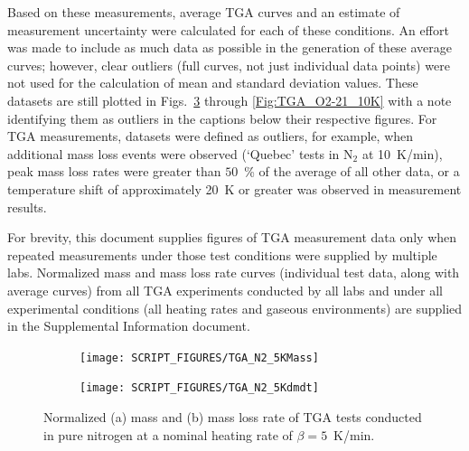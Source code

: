 \documentclass{book}
\begin{document}
Based on these measurements, average TGA curves and an estimate of measurement uncertainty were calculated for each of these conditions. An effort was made to include as much data as possible in the generation of these average curves; however, clear outliers (full curves, not just individual data points) were not used for the calculation of mean and standard deviation values. These datasets are still plotted in Figs.~\ref{Fig:TGA_N2_5K} through \ref{Fig:TGA_O2-21_10K} with a note identifying them as outliers in the captions below their respective figures. For TGA measurements, datasets were defined as outliers, for example, when additional mass loss events were observed (‘Quebec’ tests in N$_2$ at 10~K/min), peak mass loss rates were greater than $50$~\% of the average of all other data, or a temperature shift of approximately 20~K or greater was observed in measurement results.

For brevity, this document supplies figures of TGA measurement data only when repeated measurements under those test conditions were supplied by multiple labs. Normalized mass and mass loss rate curves (individual test data, along with average curves) from all TGA experiments conducted by all labs and under all experimental conditions (all heating rates and gaseous environments) are supplied in the Supplemental Information document.

\begin{figure} [p]
\centering
\begin{subfigure}[b]{0.85\textwidth}
   \texttt{[image: SCRIPT\_FIGURES/TGA\_N2\_5KMass]}
   \caption{}
   \label{Fig:TGA_N2_5KMass}
\end{subfigure}

\begin{subfigure}[b]{0.85\textwidth}
   \texttt{[image: SCRIPT\_FIGURES/TGA\_N2\_5Kdmdt]}
   \caption{}
   \label{Fig:TGA_N2_5Kdmdt}
\end{subfigure}

  \caption{Normalized (a) mass and (b) mass loss rate of TGA tests conducted in pure nitrogen at a nominal heating rate of $\beta=5$~K/min.}
  \label{Fig:TGA_N2_5K}
\end{figure}
\end{document}
